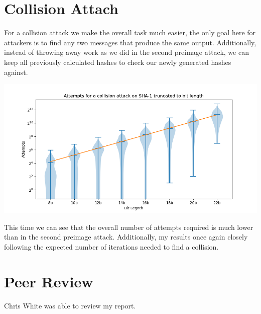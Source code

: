\documentclass[11pt]{article}
\begin{document}
\section*{Collision Attach}
\label{sec:org8e9388b}
For a collision attack we make the overall task much easier, the only goal here for attackers is to find any two messages that produce the same output. Additionally, instead of throwing away work as we did in the second preimage attack, we can keep all previously calculated hashes to check our newly generated hashes against.

\begin{center}
\includegraphics[width=.9\linewidth]{collision.png}
\end{center}

This time we can see that the overall number of attempts required is much lower than in the second preimage attack. Additionally, my results once again closely following the expected number of iterations needed to find a collision.
\section*{Peer Review}
\label{sec:orgb9b20c3}
Chris White was able to review my report.
\end{document}
